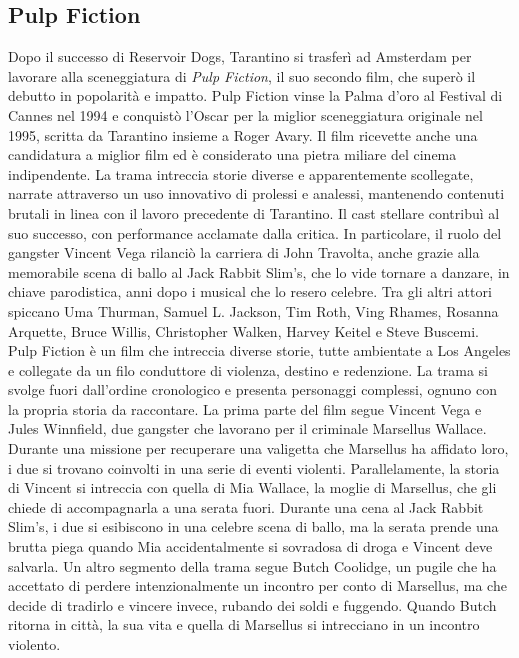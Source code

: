 \documentclass[12pt]{article} %
\begin{document}
\subsection{Pulp Fiction}
\begin{flushleft}
    Dopo il successo di Reservoir Dogs, Tarantino si trasferì ad Amsterdam per lavorare alla sceneggiatura di \textit{Pulp Fiction}, il suo secondo film, che superò il debutto in popolarità e impatto. Pulp Fiction vinse la Palma d'oro al Festival di Cannes nel 1994 e conquistò l’Oscar per la miglior sceneggiatura originale nel 1995, scritta da Tarantino insieme a Roger Avary. Il film ricevette anche una candidatura a miglior film ed è considerato una pietra miliare del cinema indipendente. 
    La trama intreccia storie diverse e apparentemente scollegate, narrate attraverso un uso innovativo di prolessi e analessi, mantenendo contenuti brutali in linea con il lavoro precedente di Tarantino. Il cast stellare contribuì al suo successo, con performance acclamate dalla critica. In particolare, il ruolo del gangster Vincent Vega rilanciò la carriera di John Travolta, anche grazie alla memorabile scena di ballo al Jack Rabbit Slim's, che lo vide tornare a danzare, in chiave parodistica, anni dopo i musical che lo resero celebre.  
    Tra gli altri attori spiccano Uma Thurman, Samuel L. Jackson, Tim Roth, Ving Rhames, Rosanna Arquette, Bruce Willis, Christopher Walken, Harvey Keitel e Steve Buscemi.
    \\\vspace{1cm}
    Pulp Fiction è un film che intreccia diverse storie, tutte ambientate a Los Angeles e collegate da un filo conduttore di violenza, destino e redenzione. La trama si svolge fuori dall'ordine cronologico e presenta personaggi complessi, ognuno con la propria storia da raccontare. 
    La prima parte del film segue Vincent Vega e Jules Winnfield, due gangster che lavorano per il criminale Marsellus Wallace. Durante una missione per recuperare una valigetta che Marsellus ha affidato loro, i due si trovano coinvolti in una serie di eventi violenti.
    Parallelamente, la storia di Vincent si intreccia con quella di Mia Wallace, la moglie di Marsellus, che gli chiede di accompagnarla a una serata fuori. Durante una cena al Jack Rabbit Slim's, i due si esibiscono in una celebre scena di ballo, ma la serata prende una brutta piega quando Mia accidentalmente si sovradosa di droga e Vincent deve salvarla. 
    Un altro segmento della trama segue Butch Coolidge, un pugile che ha accettato di perdere intenzionalmente un incontro per conto di Marsellus, ma che decide di tradirlo e vincere invece, rubando dei soldi e fuggendo. Quando Butch ritorna in città, la sua vita e quella di Marsellus si intrecciano in un incontro violento. 

\end{flushleft}
\end{document}
